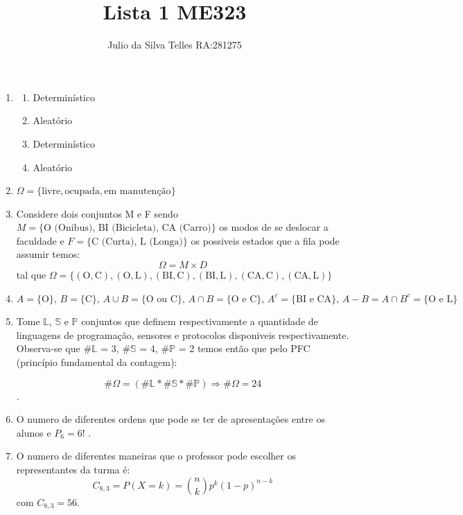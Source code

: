 \documentclass[10pt, a4paper]{article}
\title{\textbf{Lista 1 ME323}}
\author{Julio da Silva Telles RA:281275}
\begin{document}
\maketitle{}
\begin{enumerate}
    \item 
    \begin{enumerate}
        \item Determinístico
        \item Aleatório
        \item Determinístico
        \item Aleatório
    \end{enumerate}
    
    \item $\Omega = \{\text{livre}, \text{ocupada}, \text{em manutenção}\}$
    
    \item Considere dois conjuntos M e F sendo $M = \{\text{O (Onibus)}\text{, BI (Bicicleta)}\text{, CA (Carro)}\}$ os modos de se deslocar a faculdade e 
    $F = \{\text{C (Curta)} \text{, L (Longa)}\}$ os possiveis estados que a fila pode assumir temos: $$\Omega = M \times D$$ tal que 
    $\Omega = \{(\text{O},\text{C}),(\text{O},\text{L}),(\text{BI},\text{C}),(\text{BI},\text{L}),(\text{CA},\text{C}),(\text{CA},\text{L})\}$
    
    \item $A = \{\text{O}\} \text{, } B = \{\text{C}\} \text{, } A \cup B = \{\text{O ou C}\} \text{, } A \cap B = \{\text{O e C}\} \text{, } 
    A^{c} = \{\text{BI e CA}\} \text{, } A - B = A \cap B^{c} = \{\text{O e L}\}$
    
    \item Tome $\mathbb{L}$, $\mathbb{S}$ e $\mathbb{P}$ conjuntos que definem respectivamente a quantidade de linguagens de programação, sensores e protocolos
    disponiveis respectivamente. Observa-se que \#$\mathbb{L}$ = 3, \#$\mathbb{S}$ = 4, \#$\mathbb{P}$ = 2 temos então que pelo PFC (princípio fundamental da contagem): 
    
    $$\#\Omega = (\#\mathbb{L} * \#\mathbb{S} * \#\mathbb{P}) \Longrightarrow  \#\Omega = 24$$.          

    \item O numero de diferentes ordens que pode se ter de apresentações entre os alunos e $P_6 = 6!$ .
    
    \item  O numero de diferentes maneiras que o professor pode escolher os representantes da turma é:
    $$C_{8, 3} = P(X=k) = \binom{n}{k} p^k (1-p)^{n-k} $$ com $C_{8,3} = 56$.


\end{enumerate}
\end{document}

